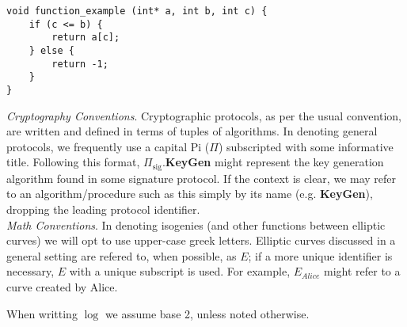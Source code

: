 \label{code:pbinv}
\begin{lstlisting}
void function_example (int* a, int b, int c) {
	if (c <= b) {
		return a[c];
	} else {
		return -1;
	}
}
\end{lstlisting}

\noindent
\textit{Cryptography Conventions}. Cryptographic protocols, as per the usual convention, are written and defined in terms of tuples of algorithms. In denoting general protocols, we frequently use a capital Pi ($\Pi$) subscripted with some informative title. Following this format, $\Pi_{\text{sig}}$.\textbf{KeyGen} might represent the key generation algorithm found in some signature protocol. If the context is clear, we may refer to an algorithm/procedure such as this simply by its name (e.g. \textbf{KeyGen}), dropping the leading protocol identifier.\\

\noindent
\textit{Math Conventions}. In denoting isogenies (and other functions between elliptic curves) we will opt to use upper-case greek letters. Elliptic curves discussed in a general setting are refered to, when possible, as $E$; if a more unique identifier is necessary, $E$ with a unique subscript is used. For example, $E_{Alice}$ might refer to a curve created by Alice.  

When writting $\log$ we assume base 2, unless noted otherwise.




